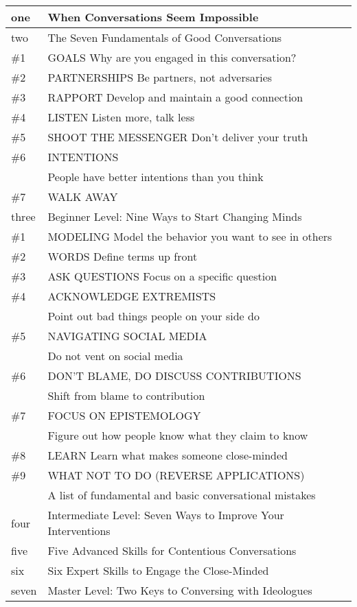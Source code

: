 \documentclass[10pt,titlepage]{book}
\begin{document}
\begin{tabular}{l | p{9cm}}
one & When Conversations Seem Impossible \\\hline
two & The Seven Fundamentals of Good Conversations \\\hline
\#1 & GOALS Why are you engaged in this conversation? \\
\#2 & PARTNERSHIPS Be partners, not adversaries \\
\#3 & RAPPORT Develop and maintain a good connection \\
\#4 & LISTEN Listen more, talk less \\
\#5 & SHOOT THE MESSENGER Don’t deliver your truth \\
\#6 & INTENTIONS \\
& People have better intentions than you think \\
\#7 & WALK AWAY\\\hline
three & Beginner Level: Nine Ways to Start Changing Minds \\\hline
\#1 & MODELING Model the behavior you want to see in others \\
\#2 & WORDS Define terms up front \\
\#3 & ASK QUESTIONS Focus on a specific question \\
\#4 & ACKNOWLEDGE EXTREMISTS\\
&Point out bad things people on your side do \\
\#5 & NAVIGATING SOCIAL MEDIA \\
&Do not vent on social media \\
\#6 & DON’T BLAME, DO DISCUSS CONTRIBUTIONS \\
&Shift from blame to contribution \\
\#7 & FOCUS ON EPISTEMOLOGY \\
& Figure out how people know what they claim to know \\
\#8 & LEARN Learn what makes someone close-minded \\
\#9 & WHAT NOT TO DO (REVERSE APPLICATIONS)\\
& A list of fundamental and basic conversational mistakes \\\hline
four & Intermediate Level: Seven Ways to Improve Your Interventions \\\hline
five & Five Advanced Skills for Contentious Conversations \\\hline
six & Six Expert Skills to Engage the Close-Minded \\\hline
seven & Master Level: Two Keys to Conversing with Ideologues \\
\end{tabular}
\end{document}
